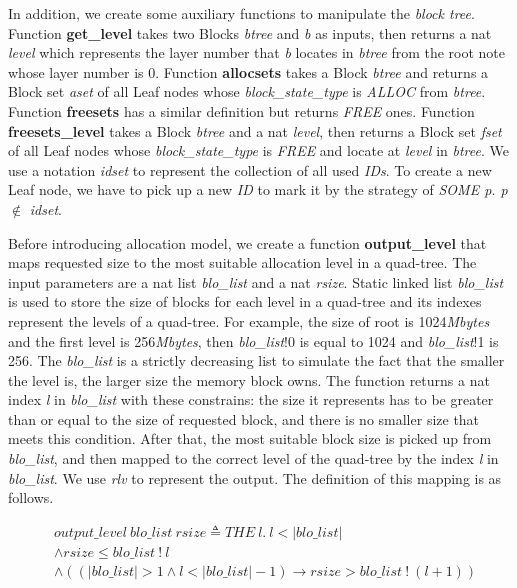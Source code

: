 In addition, we create some auxiliary functions to manipulate the \textsl{block tree}. Function \textbf{get\_level} takes two Blocks \emph{btree} and \emph{b} as inputs, then returns a nat \emph{level} which represents the layer number that \emph{b} locates in \emph{btree} from the root note whose layer number is 0. Function \textbf{allocsets} takes a Block \emph{btree} and returns a Block set \emph{aset} of all Leaf nodes whose \emph{block\_state\_type} is \emph{ALLOC} from \emph{btree}. Function \textbf{freesets} has a similar definition but returns \emph{FREE} ones. Function \textbf{freesets\_level} takes a Block \emph{btree} and a nat \emph{level}, then returns a Block set \emph{fset} of all Leaf nodes whose \emph{block\_state\_type} is \emph{FREE} and locate at \emph{level} in \emph{btree}. We use a notation \emph{idset} to represent the collection of all used \emph{IDs}. To create a new Leaf node, we have to pick up a new \emph{ID} to mark it by the strategy of \emph{SOME p. p} $\notin$ \emph{idset}.

Before introducing allocation model, we create a function \textbf{output\_level} that maps requested size to the most suitable allocation level in a quad-tree. The input parameters are a nat list \emph{blo\_list} and a nat \emph{rsize}. Static linked list \emph{blo\_list} is used to store the size of blocks for each level in a quad-tree and its indexes represent the levels of a quad-tree. For example, the size of root is 1024\emph{Mbytes} and the first level is 256\emph{Mbytes}, then \emph{blo\_list}!0 is equal to 1024 and \emph{blo\_list}!1 is 256. The \emph{blo\_list} is a strictly decreasing list to simulate the fact that the smaller the level is, the larger size the memory block owns. The function returns a nat index \emph{l} in \emph{blo\_list} with these constrains: the size it represents has to be greater than or equal to the size of requested block, and there is no smaller size that meets this condition. After that, the most suitable block size is picked up from \emph{blo\_list}, and then mapped to the correct level of the quad-tree by the index \emph{l} in \emph{blo\_list}. We use \emph{rlv} to represent the output. The definition of this mapping is as follows.

\begin{definition} 
\label{mostsuitable}
\end{definition}
\vspace{-7pt}
{\footnotesize
\begin{align*}
&output\_level\ blo\_list\ rsize \triangleq THE\ l.\ l < \vert blo\_list \vert \\
&\wedge rsize \le blo\_list\ !\ l \\
&\wedge ((\vert blo\_list \vert > 1 \wedge l < \vert blo\_list \vert - 1) \longrightarrow rsize > blo\_list\ !\ (l+1))
\end{align*}
}
\vspace{-17pt}

